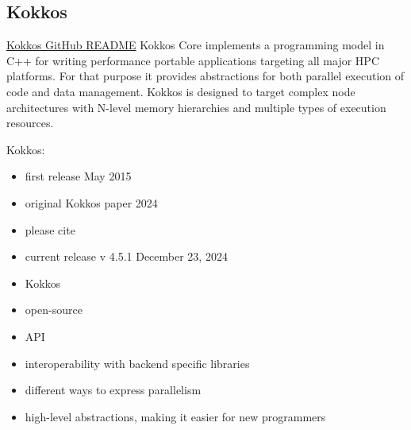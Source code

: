 \subsection{Kokkos}
\label{sec:frameworks:kokkos}

\begin{quotebox}{\href{https://github.com/kokkos/kokkos}{Kokkos GitHub README}}
    Kokkos Core implements a programming model in C++ for writing performance portable applications targeting all major HPC platforms. For that purpose it provides abstractions for both parallel execution of code and data management. Kokkos is designed to target complex node architectures with N-level memory hierarchies and multiple types of execution resources.
\end{quotebox}

Kokkos:
\begin{itemize}
    \item first release May 2015~\cite{trott_kokkos_2015}
    \item original Kokkos paper 2024~\cite{carter_edwards_kokkos_2014}
    \item please cite~\cite{trott_kokkos_2022}
    \item current release v 4.5.1 December 23, 2024~\cite{noauthor_release_2024}
\end{itemize}

\begin{itemize}
    \item Kokkos
    \item open-source
    \item \cpp API
    \item interoperability with backend specific libraries
    \item different ways to express parallelism
    \item high-level abstractions, making it easier for new programmers
\end{itemize}

